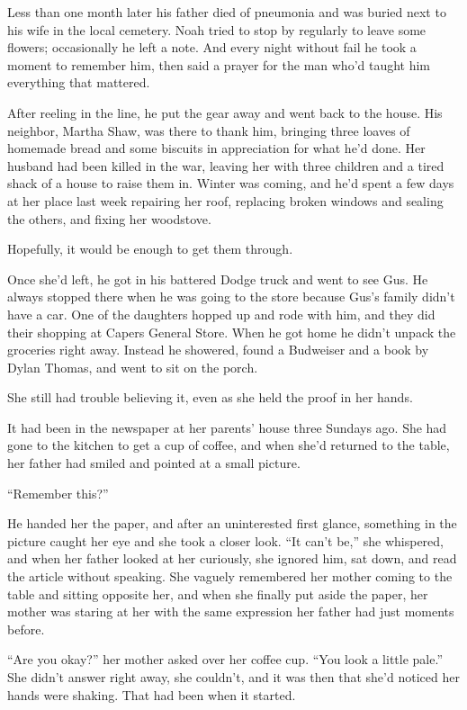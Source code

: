 \documentclass[10pt, twoside, openright]{book}
\begin{document}
Less than one month later his father died of pneumonia and was buried
next to his wife in the local cemetery. Noah tried to stop by regularly
to leave some flowers; occasionally he left a note. And every night
without fail he took a moment to remember him, then said a prayer for
the man who'd taught him everything that mattered.

After reeling in the line, he put the gear away and went back to the
house. His neighbor, Martha Shaw, was there to thank him, bringing three
loaves of homemade bread and some biscuits in appreciation for what he'd
done. Her husband had been killed in the war, leaving her with three
children and a tired shack of a house to raise them in. Winter was
coming, and he'd spent a few days at her place last week repairing her
roof, replacing broken windows and sealing the others, and fixing her
woodstove.

Hopefully, it would be enough to get them through.

Once she'd left, he got in his battered Dodge truck and went to see Gus.
He always stopped there when he was going to the store because Gus's
family didn't have a car. One of the daughters hopped up and rode with
him, and they did their shopping at Capers General Store. When he got
home he didn't unpack the groceries right away. Instead he showered,
found a Budweiser and a book by Dylan Thomas, and went to sit on the
porch.

She still had trouble believing it, even as she held the proof in her
hands.

It had been in the newspaper at her parents' house three Sundays ago.
She had gone to the kitchen to get a cup of coffee, and when she'd
returned to the table, her father had smiled and pointed at a small
picture.

``Remember this?''

He handed her the paper, and after an uninterested first glance,
something in the picture caught her eye and she took a closer look. ``It
can't be,'' she whispered, and when her father looked at her curiously,
she ignored him, sat down, and read the article without speaking. She
vaguely remembered her mother coming to the table and sitting opposite
her, and when she finally put aside the paper, her mother was staring at
her with the same expression her father had just moments before.

``Are you okay?'' her mother asked over her coffee cup. ``You look a
little pale.'' She didn't answer right away, she couldn't, and it was
then that she'd noticed her hands were shaking. That had been when it
started.
\end{document}
